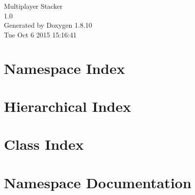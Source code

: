 \documentclass[twoside]{book}
\newcommand{\+}{\discretionary{\mbox{\scriptsize$\hookleftarrow$}}{}{}}
\newcommand{\clearemptydoublepage}{%
  \newpage{\pagestyle{empty}\cleardoublepage}%
}
\begin{document}
\hypersetup{pageanchor=false,
             bookmarks=true,
             bookmarksnumbered=true,
             pdfencoding=unicode
            }
\begin{titlepage}
\vspace*{7cm}
\begin{center}%
{\Large Multiplayer Stacker \\[1ex]\large 1.\+0 }\\
\vspace*{1cm}
{\large Generated by Doxygen 1.8.10}\\
\vspace*{0.5cm}
{\small Tue Oct 6 2015 15:16:41}\\
\end{center}
\end{titlepage}
\clearemptydoublepage
\tableofcontents
\clearemptydoublepage
{}
\hypersetup{pageanchor=true}

\chapter{Namespace Index}

\chapter{Hierarchical Index}

\chapter{Class Index}

\chapter{Namespace Documentation}

\end{document}
